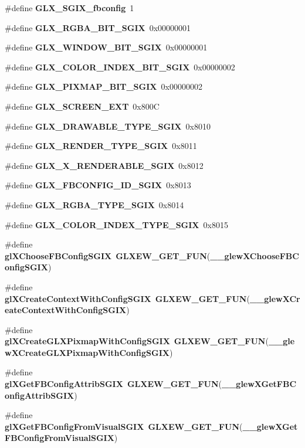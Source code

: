 \begin{DoxyCompactItemize}
\item 
\#define {\bf G\+L\+X\+\_\+\+S\+G\+I\+X\+\_\+fbconfig}~1
\item 
\#define {\bf G\+L\+X\+\_\+\+R\+G\+B\+A\+\_\+\+B\+I\+T\+\_\+\+S\+G\+IX}~0x00000001
\item 
\#define {\bf G\+L\+X\+\_\+\+W\+I\+N\+D\+O\+W\+\_\+\+B\+I\+T\+\_\+\+S\+G\+IX}~0x00000001
\item 
\#define {\bf G\+L\+X\+\_\+\+C\+O\+L\+O\+R\+\_\+\+I\+N\+D\+E\+X\+\_\+\+B\+I\+T\+\_\+\+S\+G\+IX}~0x00000002
\item 
\#define {\bf G\+L\+X\+\_\+\+P\+I\+X\+M\+A\+P\+\_\+\+B\+I\+T\+\_\+\+S\+G\+IX}~0x00000002
\item 
\#define {\bf G\+L\+X\+\_\+\+S\+C\+R\+E\+E\+N\+\_\+\+E\+XT}~0x800C
\item 
\#define {\bf G\+L\+X\+\_\+\+D\+R\+A\+W\+A\+B\+L\+E\+\_\+\+T\+Y\+P\+E\+\_\+\+S\+G\+IX}~0x8010
\item 
\#define {\bf G\+L\+X\+\_\+\+R\+E\+N\+D\+E\+R\+\_\+\+T\+Y\+P\+E\+\_\+\+S\+G\+IX}~0x8011
\item 
\#define {\bf G\+L\+X\+\_\+\+X\+\_\+\+R\+E\+N\+D\+E\+R\+A\+B\+L\+E\+\_\+\+S\+G\+IX}~0x8012
\item 
\#define {\bf G\+L\+X\+\_\+\+F\+B\+C\+O\+N\+F\+I\+G\+\_\+\+I\+D\+\_\+\+S\+G\+IX}~0x8013
\item 
\#define {\bf G\+L\+X\+\_\+\+R\+G\+B\+A\+\_\+\+T\+Y\+P\+E\+\_\+\+S\+G\+IX}~0x8014
\item 
\#define {\bf G\+L\+X\+\_\+\+C\+O\+L\+O\+R\+\_\+\+I\+N\+D\+E\+X\+\_\+\+T\+Y\+P\+E\+\_\+\+S\+G\+IX}~0x8015
\item 
\#define {\bf gl\+X\+Choose\+F\+B\+Config\+S\+G\+IX}~{\bf G\+L\+X\+E\+W\+\_\+\+G\+E\+T\+\_\+\+F\+UN}({\bf \+\_\+\+\_\+glew\+X\+Choose\+F\+B\+Config\+S\+G\+IX})
\item 
\#define {\bf gl\+X\+Create\+Context\+With\+Config\+S\+G\+IX}~{\bf G\+L\+X\+E\+W\+\_\+\+G\+E\+T\+\_\+\+F\+UN}({\bf \+\_\+\+\_\+glew\+X\+Create\+Context\+With\+Config\+S\+G\+IX})
\item 
\#define {\bf gl\+X\+Create\+G\+L\+X\+Pixmap\+With\+Config\+S\+G\+IX}~{\bf G\+L\+X\+E\+W\+\_\+\+G\+E\+T\+\_\+\+F\+UN}({\bf \+\_\+\+\_\+glew\+X\+Create\+G\+L\+X\+Pixmap\+With\+Config\+S\+G\+IX})
\item 
\#define {\bf gl\+X\+Get\+F\+B\+Config\+Attrib\+S\+G\+IX}~{\bf G\+L\+X\+E\+W\+\_\+\+G\+E\+T\+\_\+\+F\+UN}({\bf \+\_\+\+\_\+glew\+X\+Get\+F\+B\+Config\+Attrib\+S\+G\+IX})
\item 
\#define {\bf gl\+X\+Get\+F\+B\+Config\+From\+Visual\+S\+G\+IX}~{\bf G\+L\+X\+E\+W\+\_\+\+G\+E\+T\+\_\+\+F\+UN}({\bf \+\_\+\+\_\+glew\+X\+Get\+F\+B\+Config\+From\+Visual\+S\+G\+IX})

\end{DoxyCompactItemize}
